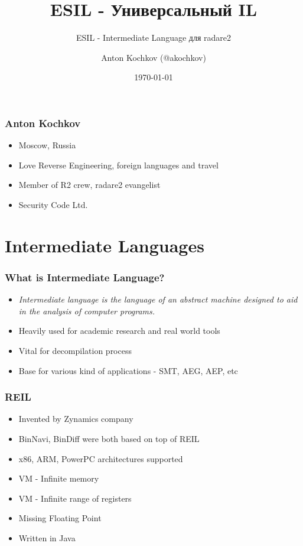 \documentclass[10pt,pdf,utf8,english,compress,hyperref={unicode}]{beamer}
\title{ESIL - Универсальный IL}
\subtitle{ESIL - Intermediate Language для radare2}
\author{Anton Kochkov (@akochkov)}
\date{\today}
\institute{ZeroNights 11-2015}
\begin{document}
\maketitle

\begin{frame}[fragile]
  \frametitle{Anton Kochkov}
    \begin{itemize}
    \item Moscow, Russia
    \item Love Reverse Engineering, foreign languages and travel
	\item Member of R2 crew, radare2 evangelist
    \item Security Code Ltd.
    \end{itemize}
\end{frame}

\section{Intermediate Languages}

\begin{frame}[fragile]
  \frametitle{What is Intermediate Language?}
  \begin{itemize}
  \item {\it Intermediate language is the language of an abstract machine designed to aid in the analysis
  of computer programs. \cite{il-wikipedia}}
  \item Heavily used for academic research and real world tools
  \item Vital for decompilation process
  \item Base for various kind of applications - SMT, AEG, AEP, etc
  \end{itemize}
\end{frame}

\begin{frame}[fragile]
  \frametitle{REIL }
  \begin{itemize}
  \item Invented by Zynamics company
  \item BinNavi, BinDiff were both based on top of REIL
  \item x86, ARM, PowerPC architectures supported
  \item VM - Infinite memory
  \item VM - Infinite range of registers
  \item Missing Floating Point
  \item Written in Java
  \end{itemize}
\end{frame}
\end{document}
